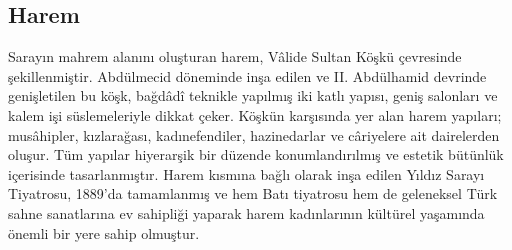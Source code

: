 \subsection{Harem}
\indent\indent Sarayın mahrem alanını oluşturan harem, Vâlide Sultan Köşkü çevresinde şekillenmiştir. Abdülmecid döneminde inşa edilen ve II. Abdülhamid devrinde genişletilen bu köşk, bağdâdî teknikle yapılmış iki katlı yapısı, geniş salonları ve kalem işi süslemeleriyle dikkat çeker. Köşkün karşısında yer alan harem yapıları; musâhipler, kızlarağası, kadınefendiler, hazinedarlar ve câriyelere ait dairelerden oluşur. Tüm yapılar hiyerarşik bir düzende konumlandırılmış ve estetik bütünlük içerisinde tasarlanmıştır. Harem kısmına bağlı olarak inşa edilen Yıldız Sarayı Tiyatrosu, 1889’da tamamlanmış ve hem Batı tiyatrosu hem de geleneksel Türk sahne sanatlarına ev sahipliği yaparak harem kadınlarının kültürel yaşamında önemli bir yere sahip olmuştur.\cite{dia_7}